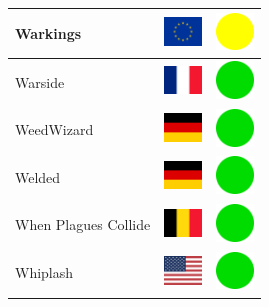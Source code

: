 \documentclass[12pt, a4paper, twoside]{report}
\begin{document}
\begin{center}
\begin{longtable}{|p{5cm}|p{2cm}|p{2cm}|}
 Warkings                                                   & \includegraphics[width=1cm]{../img/flags/eu} &   \includegraphics[width=1cm]{../likes/m} \\ \hline
 Warside                                                    & \includegraphics[width=1cm]{../img/flags/fr} &   \includegraphics[width=1cm]{../likes/y} \\ \hline
 WeedWizard                                                 & \includegraphics[width=1cm]{../img/flags/de} &   \includegraphics[width=1cm]{../likes/y} \\ \hline
 Welded                                                     & \includegraphics[width=1cm]{../img/flags/de} &   \includegraphics[width=1cm]{../likes/y} \\ \hline
 When Plagues Collide                                       & \includegraphics[width=1cm]{../img/flags/be} &   \includegraphics[width=1cm]{../likes/y} \\ \hline
 Whiplash                                                   & \includegraphics[width=1cm]{../img/flags/us} &   \includegraphics[width=1cm]{../likes/y} \\ \hline

\end{longtable}
\end{center}
\end{document}
